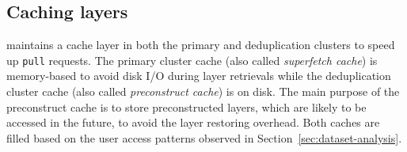 
\subsection{Caching layers}
\label{sec:cache-design}


%


\sysname maintains a cache layer in both the primary and deduplication clusters to speed up
\texttt{pull} requests. The primary cluster cache (also called \emph{superfetch cache}) is
memory-based to avoid disk I/O during layer retrievals while the deduplication cluster cache
(also called \emph{preconstruct cache}) is on disk. The main purpose of the preconstruct
cache is to store preconstructed layers, which are likely to be accessed in the future,
to avoid the layer restoring overhead.
%
Both caches are filled based on the user access patterns observed in Section~\ref{sec:dataset-analysis}.
%

